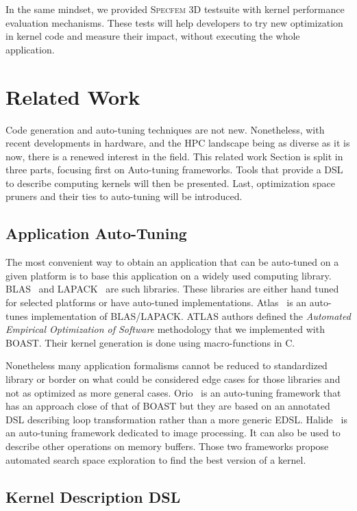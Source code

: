 \documentclass[11pt, a4paper, twoside]{montblanc}
\newcommand{\productname}[1]{\textsc{#1}}
\newcommand{\Specfem}{\productname{Specfem 3D}\xspace}
\begin{document}
In the same mindset, we provided \Specfem testsuite with kernel
performance evaluation mechanisms. These tests will help developers to
try new optimization in kernel code and measure their impact, without
executing the whole application.

\section{Related Work}

Code generation and auto-tuning techniques are not new. Nonetheless, with recent
developments in hardware, and the HPC landscape being as diverse as it is now,
there is a renewed interest in the field. This related work Section is split in
three parts, focusing first on Auto-tuning frameworks. Tools that provide a DSL
to describe computing kernels will then be presented. Last, optimization space
pruners and their ties to auto-tuning will be introduced.

  \subsection{Application Auto-Tuning} 

  The most convenient way to obtain an application that can be auto-tuned on a
given platform is to base this application on a widely used computing library.
BLAS~\cite{dongarra1990set} and LAPACK~\cite{laug} are such libraries. These
libraries are either hand tuned for selected platforms or have auto-tuned
implementations. Atlas~\cite{whaley04} is an auto-tunes implementation of
BLAS/LAPACK. ATLAS authors defined the \emph{Automated Empirical Optimization of
Software} methodology that we implemented with BOAST. Their kernel generation is
done using macro-functions in C.

  Nonetheless many application formalisms cannot be reduced to standardized
library or border on what could be considered edge cases for those libraries and
not as optimized as more general cases. Orio~\cite{Hart2009:Orio} is an
auto-tuning framework that has an approach close of that of BOAST but they are
based on an annotated DSL describing loop transformation rather than a more
generic EDSL. Halide~\cite{ragan2013halide} is an auto-tuning framework
dedicated to image processing. It can also be used to describe other
operations on memory buffers. Those two frameworks propose automated search
space exploration to find the best version of a kernel.

  \subsection{Kernel Description DSL}
\end{document}
